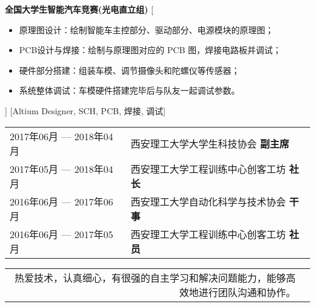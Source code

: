 \documentclass[zh]{resume}
\begin{document}
\begin{experiences}
    {\textbf{全国大学生智能汽车竞赛(光电直立组)}}
    [%
        \begin{itemize}
            \item {原理图设计：绘制智能车主控部分、驱动部分、电源模块的原理图；}
            \item {PCB设计与焊接：绘制与原理图对应的 PCB 图，焊接电路板并调试；}
            \item {硬件部分搭建：组装车模、调节摄像头和陀螺仪等传感器；}
            \item {系统整体调试：车模硬件搭建完毕后与队友一起调试参数。}
        \end{itemize}]
    [Altium Designer, SCH, PCB, 焊接, 调试]
\end{experiences}

\begin{table}[!htbp]
    \begin{tabular}{ll}
        2017年06月 --- 2018年04月 & 西安理工大学大学生科技协会 \textbf{副主席}     \\
        2017年05月 --- 2018年04月 & 西安理工大学工程训练中心创客工坊 \textbf{社长} \\
        2016年06月 --- 2017年06月 & 西安理工大学自动化科学与技术协会 \textbf{干事} \\
        2016年06月 --- 2017年05月 & 西安理工大学工程训练中心创客工坊 \textbf{社员} \\
    \end{tabular}
\end{table}

\begin{table}[!htbp]
    \begin{tabular}{rl}
        热爱技术，认真细心，有很强的自主学习和解决问题能力，能够高效地进行团队沟通和协作。
    \end{tabular}
\end{table}
\end{document}
